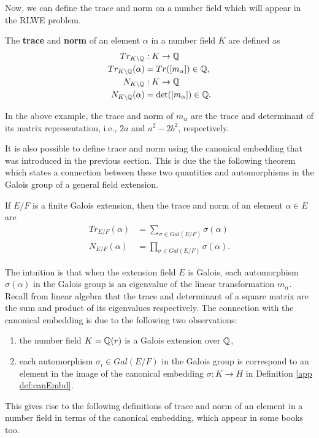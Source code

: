 \documentclass[../main.tex]{subfiles}
\begin{document}
Now, we can define the trace and norm on a number field which will appear in the RLWE problem.
\begin{definition}
\label{app def:trcNorm}
The \textbf{trace} and \textbf{norm} of an element $\alpha$ in a number field $K$ are defined as 
\reversemarginpar
{}
\begin{align*}
    Tr_{K \setminus \Q}&: K \rightarrow \Q \\%
    Tr_{K \setminus \Q}(\alpha) &= Tr([m_{\alpha}]) \in \Q, \\
    N_{K \setminus \Q}&:K \rightarrow \Q \\%
    N_{K \setminus \Q}(\alpha) &= \det([m_{\alpha}]) \in \Q.
\end{align*}
\end{definition}

\begin{example}
In the above example, the trace and norm of $m_{\alpha}$ are the trace and determinant of its matrix representation, i.e., $2a$ and $a^2 - 2b^2$, respectively. 
\end{example}

It is also possible to define trace and norm using the canonical embedding that was introduced in the previous section. This is due the the following theorem which states a connection between these two quantities and automorphisms in the Galois group of a general field extension. 

\begin{theorem}
If $E/F$ is a finite Galois extension, then the trace and norm of an element $\alpha \in E$ are 
\begin{align*}
    Tr_{E/F}(\alpha) &= \sum_{\sigma \in Gal(E/F)} \sigma(\alpha) \\
    N_{E/F}(\alpha) &= \prod_{\sigma \in Gal(E/F)} \sigma(\alpha). 
\end{align*}
\end{theorem}
The intuition is that when the extension field $E$ is Galois, each automorphism $\sigma(\alpha)$ in the Galois group is an eigenvalue of the linear transformation $m_{\alpha}$. Recall from linear algebra that the trace and determinant of a square matrix are the sum and product of its eigenvalues respectively. The connection with the canonical embedding is due to the following two observations:  
\begin{enumerate}
    \item the number field $K = \mathbb{Q}(r)$ is a Galois extension over $\mathbb{Q}$,
    \item each automorphism $\sigma_i \in Gal(E/F)$ in the Galois group is correspond to an element in the image of the canonical embedding $\sigma: K \rightarrow H$ in Definition \ref{app def:canEmbd}. 
\end{enumerate}
\noindent This gives rise to the following definitions of trace and norm of an element in a number field in terms of the canonical embedding, which appear in some books too. 
\end{document}

